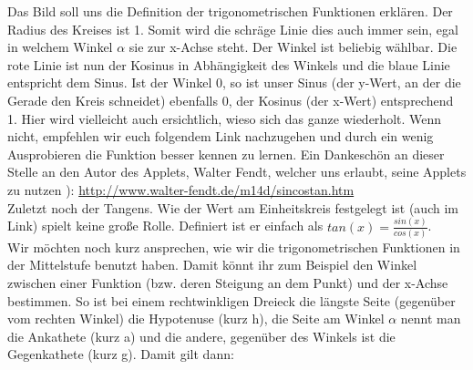 			Das Bild soll uns die Definition der trigonometrischen Funktionen erklären.
			Der Radius des Kreises ist 1. Somit wird die schräge Linie dies auch immer
			sein, egal in welchem Winkel \(\alpha\) sie zur x-Achse steht. Der Winkel ist
			beliebig wählbar. Die rote Linie ist nun der Kosinus in Abhängigkeit des
			Winkels und die blaue Linie entspricht dem Sinus. Ist der Winkel 0, so ist
			unser Sinus (der y-Wert, an der die Gerade den Kreis schneidet) ebenfalls 0,
			der Kosinus (der x-Wert) entsprechend 1. Hier wird vielleicht auch
			ersichtlich, wieso sich das ganze wiederholt. Wenn nicht, empfehlen wir euch
			folgendem Link nachzugehen und durch ein wenig Ausprobieren die Funktion
			besser kennen zu lernen. Ein Dankeschön an dieser Stelle an den Autor des
			Applets, Walter Fendt, welcher uns erlaubt, seine Applets zu nutzen ):
			\url{http://www.walter-fendt.de/m14d/sincostan.htm}\\
			Zuletzt noch der Tangens. Wie der Wert am Einheitskreis festgelegt ist (auch
			im Link) spielt keine große Rolle. Definiert ist er einfach als
			\(tan(x)=\frac{sin(x)}{cos(x)}\).\\
			Wir möchten noch kurz ansprechen, wie wir die trigonometrischen Funktionen in
			der Mittelstufe benutzt haben. Damit könnt ihr zum Beispiel den Winkel
			zwischen einer Funktion (bzw. deren Steigung an dem Punkt) und der x-Achse
			bestimmen. So ist bei einem rechtwinkligen Dreieck die längste Seite
			(gegenüber vom rechten Winkel) die Hypotenuse (kurz h), die Seite am Winkel
			\(\alpha\) nennt man die Ankathete (kurz a) und die andere, gegenüber des
			Winkels ist die Gegenkathete (kurz g). Damit gilt dann:
			\\ \\
			\formel{\[sin(\alpha)=\frac{g}{h},\ cos(\alpha)=\frac{a}{h},\
			tan(\alpha)=\frac{g}{a}\]}
			\\ \\
